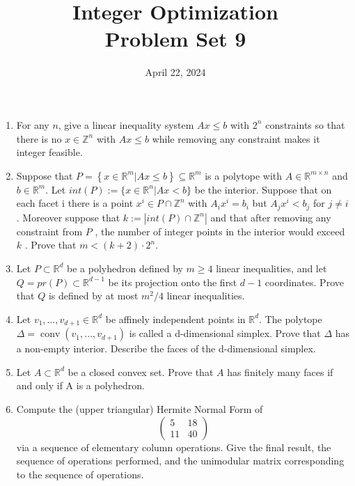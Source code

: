 \documentclass[11pt,a4paper]{article}
\title{Integer Optimization  \\ Problem Set 9 }
\date{ April 22, 2024}
\renewcommand{\leq}{\leqslant}
\renewcommand{\geq}{\geqslant}
\DeclareMathOperator{\conv}{conv}
\begin{document}
\maketitle 


\begin{enumerate}


\item For any $n$, give a linear inequality system $Ax \leq b$ with $2^n$ constraints so that there is no
$x ∈ \mathbb{Z}^n$ with $A x \leq b$ while removing any constraint makes it integer feasible.

\item Suppose that $P=\left\{x∈\mathbb{R}^m |Ax\leq b\right\}⊆ \mathbb{R}^m$ is a polytope with $A∈\mathbb{R}^{m×n}$ and $b∈\mathbb{R}^m$. Let $int(P):=\{x∈\mathbb{R}^n |Ax<b\}$ be the interior. Suppose that on each facet i there is a point $x^i ∈ P∩\mathbb{Z}^n$ with $A_i x^i = b_i$ but $A_j x^i < b_j$ for $j\neq i$. Moreover suppose that $k := |int(P)∩ \mathbb{Z}^n|$ and that after removing any constraint from $P$ , the number of integer points in the interior would exceed $k$ . Prove that $m < (k + 2) \cdot 2^n$.

\item Let $P ⊂ \mathbb{R}^d$ be a polyhedron defined by $m \geq 4$ linear inequalities, and let
$Q = pr(P) ⊂ \mathbb{R}^{d−1}$ be its projection onto the first $d-1$ coordinates. Prove that $Q$ is defined by at most $m^2/4$ linear inequalities.

\item Let $v_1, \hdots , v_{d+1} ∈ \mathbb{R}^d$ be affinely independent points in $\mathbb{R}^d$. The polytope $Δ = \conv (v_1 , \hdots , v_{d+1})$ is called a d-dimensional simplex. Prove that $Δ$ has a non-empty interior. Describe the faces of the d-dimensional simplex.

\item Let $A ⊂ \mathbb{R}^d$ be a closed convex set. Prove that $A$ has finitely many faces if and only if A is a polyhedron.

\item Compute the (upper triangular) Hermite Normal Form of $$ \left(\begin{matrix}
    5 & 18 \\
    11 & 40
\end{matrix}\right)$$ via a sequence
of elementary column operations. Give the final result, the sequence of operations performed, and the unimodular matrix corresponding to the sequence of operations.


\end{enumerate}


%
%


 
\end{document}
